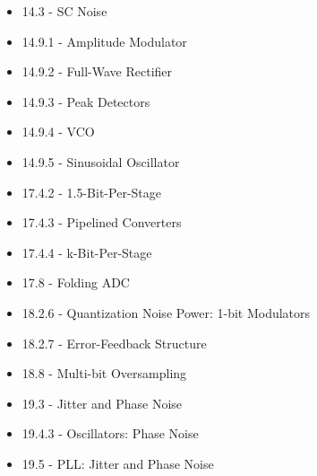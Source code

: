 \begin{itemize}
  \item 14.3   - SC Noise
  \item 14.9.1 - Amplitude Modulator
  \item 14.9.2 - Full-Wave Rectifier
  \item 14.9.3 - Peak Detectors
  \item 14.9.4 - VCO
  \item 14.9.5 - Sinusoidal Oscillator

  \item 17.4.2 - 1.5-Bit-Per-Stage
  \item 17.4.3 - Pipelined Converters
  \item 17.4.4 - k-Bit-Per-Stage
  \item 17.8   - Folding ADC

  \item 18.2.6 - Quantization Noise Power: 1-bit Modulators
  \item 18.2.7 - Error-Feedback Structure
  \item 18.8   - Multi-bit Oversampling

  \item 19.3   - Jitter and Phase Noise
  \item 19.4.3 - Oscillators: Phase Noise
  \item 19.5   - PLL: Jitter and Phase Noise
\end{itemize}
